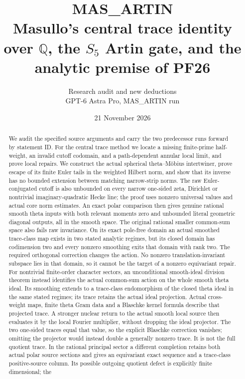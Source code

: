 \documentclass[11pt,a4paper]{article}
\title{MAS\_ARTIN\\[5pt]\large Masullo's central trace identity over
$\mathbb Q$, the $S_5$ Artin gate, and the analytic premise of PF26}
\author{Research audit and new deductions\\GPT-6 Astra Pro, MAS\_ARTIN run}
\date{21 November 2026\\\small\RunStatus}
\begin{document}
\maketitle
\begin{abstract}
We audit the specified source arguments and carry the two predecessor
runs forward by statement ID. For the central trace method we locate
a missing finite-prime half-weight, an invalid cutoff codomain, and
a path-dependent annular local limit, and prove local repairs. We
construct the actual spherical theta--M\"obius intertwiner, prove
escape of its finite Euler tails in the weighted Hilbert norm, and
show that its inverse has no bounded extension between matching
narrow-strip norms. The raw Euler-conjugated cutoff is also unbounded on every
narrow one-sided zeta, Dirichlet or nontrivial imaginary-quadratic
Hecke line; the proof uses
nonzero universal values and actual core norm estimates.
An exact polar comparison then gives genuine rational smooth
theta inputs with both relevant moments zero and unbounded
literal geometric diagonal outputs, all in the smooth space.
The original rational smaller common-sum space also fails
raw invariance. On its exact pole-free domain an actual
smoothed trace-class map exists in two stated analytic regimes,
but its closed domain has codimension two and every nonzero
smoothing exits that domain with rank two. The required
orthogonal correction changes the action. No nonzero
translation-invariant subspace lies in that domain, so it
cannot be the target of a nonzero equivariant repair.
For nontrivial finite-order character sectors, an unconditional
smooth-ideal division theorem instead identifies the actual
common-sum action on the whole smooth theta ideal. Its smoothing
extends to a trace-class endomorphism of the closed theta ideal
in the same stated regimes; its trace retains the actual ideal
projection. Actual cross-weight maps, finite theta Gram data and
a Blaschke kernel formula describe that projected trace. A
stronger nuclear return to the actual smooth local source then
evaluates it by the local Fourier multiplier, without dropping
the ideal projector. The two one-sided traces equal that value,
so the explicit Blaschke correction vanishes; omitting the
projector would instead double a generally nonzero trace.
It is not the full quotient trace. In the
rational principal sector a different completion retains both
actual polar source sections and gives an equivariant exact
sequence and a trace-class positive-source column. Its possible
outgoing quotient defect is explicitly finite dimensional; the

\end{abstract}
\end{document}
